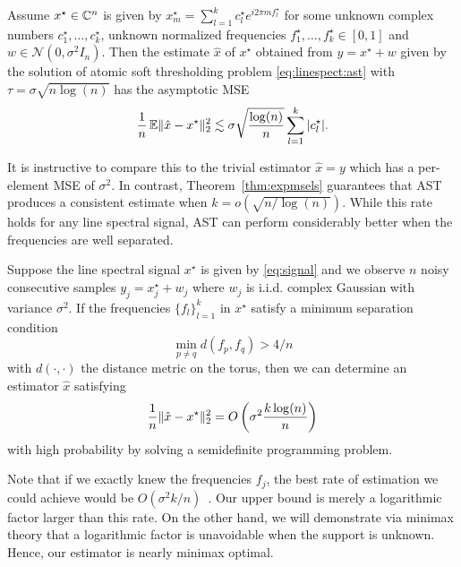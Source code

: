 \begin{theorem}
\label{thm:expmsels}

Assume $x^\star \in \mathbb{C}^n$ is given by $x_m^\star = \sum_{l=1}^k{c_l^\star
e^{i2\pi m f_l^\star}}$ for some unknown complex numbers $c_1^\star, \ldots,
c_k^\star$, unknown normalized frequencies $f_1^\star, \ldots, f_k^\star \in
[0,1]$ and $w \in \mathcal{N}(0,\sigma^2 I_n)$. Then the estimate $\hat{x}$ of
$x^\star$ obtained from $y=x^\star+w$ given by the solution of atomic soft
thresholding problem \eqref{eq:linespect:ast} with $\tau = \sigma \sqrt{n \log(n)}$ has the
asymptotic MSE \belowdisplayskip=-10pt \[ \frac{1}{n} \operatorname{\mathbb{E}} \lVert\hat{x} -
x^\star\rVert_2^2 \lesssim \sigma\sqrt{\frac{\log(n)}{n}}\sum_{l=1}^k |c_l^\star|. \]
\end{theorem}

It is instructive to compare this to the trivial estimator $\hat{x} = y$ which
has a per-element MSE of $\sigma^2$. In contrast, Theorem~\ref{thm:expmsels}
guarantees that AST produces a consistent estimate when $k =
o(\sqrt{n/\log(n)})$. While this rate holds for any line spectral signal, AST
can perform considerably better when the frequencies are well separated.

\begin{theorem}
\label{main}
Suppose the line spectral signal $x^\star$ is given by \eqref{eq:signal}
and we observe $n$ noisy consecutive samples $y_j = x^\star_j + w_j$ where $w_j$ is i.i.d. complex Gaussian with variance $\sigma^2$. If the frequencies  $\{f_l\}_{l=1}^k$ in $x^\star$ satisfy a minimum separation condition
\begin{equation}
\label{min-sep}
\min_{p\neq q}d(f_p,f_q) > 4/n
\end{equation}
with $d(\cdot, \cdot)$ the distance metric on the torus, then we can determine an estimator $\hat{x}$ satisfying
\begin{equation}
\label{fast-rate}
\frac{1}{n}\lVert\hat{x} - x^\star\rVert_2^2 = O\left( \sigma^2 \frac{k \log(n)}{n}\right)  
\end{equation}
with high probability by solving a semidefinite programming problem.
\end{theorem}

Note that if we exactly knew the frequencies $f_j$, the best rate of estimation
we could achieve would be $O(\sigma^2 k / n)$~\cite{oracle_lasso}. Our upper
bound is merely a logarithmic factor larger than this rate. On the other hand,
we will demonstrate via minimax theory that a logarithmic factor is unavoidable
when the support is unknown. Hence, our estimator is nearly minimax optimal.

